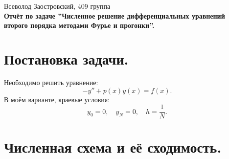 \documentclass[14pt,a4paper]{extarticle}
\newcommand{\1}{\mathbbm{1}}
\begin{document}
\begin{center}

    {Всеволод Заостровский, 409 группа}\\
    {\bfseries Отчёт по задаче ''Численное решение дифференциальных уравнений второго порядка методами Фурье и прогонки''.\\}
    \vspace{1cm}

\end{center}

\section{Постановка задачи.} Необходимо решить уравнение:
\begin{equation} \label{de1}
    -y'' + p(x) y(x) = f(x).
\end{equation}
В моём варианте, краевые условия:
\begin{equation} \label{diffeqedge}
    y_0 = 0, \quad y_N = 0, \quad h = \frac{1}{N}. 
\end{equation}

\section{Численная схема и её сходимость.}
\end{document}
